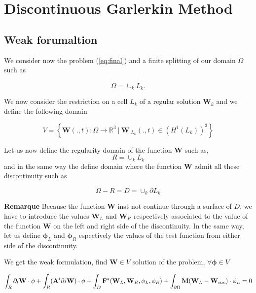 \documentclass[a4paper,oneside,10pt]{report}
\begin{document}
\section{Discontinuous Garlerkin Method}

\subsection{Weak forumaltion}

We consider now the problem (\ref{eq:final}) and a finite splitting of our domain $\Omega$ such as

\begin{equation}
\bar{\Omega} = \cup_k \bar{L}_k.
\end{equation}

We now consider the restriction on a cell $L_k$ of a regular solution $\mathbf{W}_k$ and we define the following domain 

\begin{equation}
V = \left\{\mathbf{W}(.,t) : \Omega \rightarrow \mathbb{R}^3\ | \ \mathbf{W}_{|L_k}(.,t) \in  (H^1(L_k))^3 \right\}
\end{equation}

Let us now define the regularity domain of the function $\mathbf{W}$ such as,
\begin{equation}
R = \cup_k L_k
\end{equation} 
and in the same way the define domain where the function $\mathbf{W}$ admit all these discontinuity such as

\begin{equation}
\Omega - R = D = \cup_k \partial L_k
\end{equation}


\textbf{Remarque} Because the function $\mathbf{W}$ inst not continue  through a surface of $D$, we have to introduce the values $\mathbf{W}_L$ and $\mathbf{W}_R$ respectively associated to the value of the function  $\mathbf{W}$ on the left and right side of the discontinuity. In the same way, let us define $\mathbf{\phi}_L$ and $\mathbf{\phi}_R$ espectively the values of the test function from either side of the discontinuity. 
\newline

We get the weak formulation, find $\mathbf{W} \in V$ solution of the problem, $\forall \mathbf{\phi} \in V$

\begin{equation}
\int_R \partial_t \mathbf{W} \cdot \mathbf{\phi}+
\int_R  (\mathbf{A}^i \partial i \mathbf{W}) \cdot \mathbf{\phi}+
\int_D \mathbf{F}^*(\mathbf{W}_L,\mathbf{W}_R,\mathbf{\phi}_L,\mathbf{\phi}_R)+
\int_{\partial \Omega} \mathbf{M}(\mathbf{W}_L - \mathbf{W}_{inc})\cdot \mathbf{\phi}_L=0\\
\end{equation}
\end{document}
